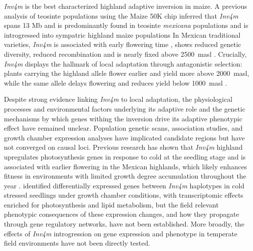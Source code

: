 \documentclass[9pt,twocolumn,twoside]{rilabRxiv}
\newcommand{\mex}{\textit{mexicana}\xspace}
\newcommand{\invfour}{\textit{Inv4m}\xspace}
\begin{document}
\invfour is the best characterized highland adaptive inversion in maize.
A previous analysis of teosinte populations using the Maize 50K chip inferred that \invfour spans 13 Mb and is predominantly found in teosinte \mex populations \cite{pyhajarvi2013} and is introgressed into sympatric highland maize populations \cite{pyhajarvi2013,calfee2021-mr,hufford2013-gs}
In Mexican traditional varieties, \invfour is associated with early flowering time \citep{romero_navarro2017-cn}, shows reduced genetic diversity, reduced recombination \citep{gonzalez-segovia2019-jy} and is nearly fixed above 2500~masl \citep{crow2020}.
Crucially, \invfour displays the hallmark of local adaptation through
antagonistic selection: plants carrying the highland allele flower
earlier and yield more above 2000~masl, while the same allele delays
flowering and reduces yield below 1000~masl \citep{crow2020}.

Despite strong evidence linking \invfour to local adaptation, the physiological processes and environmental factors underlying its adaptive role and the genetic mechanisms by which genes withing the inversion drive its adaptive phenotypic effect have remained unclear.
Population genetic scans, association studies, and growth chamber expression analyses have implicated candidate regions but have not converged on causal loci.
Previous research has shown that \invfour highland upregulates photosynthesis genes in response to cold at the seedling stage \cite{crow2020} and is associated with earlier flowering in the Mexican highlands, which likely enhances fitness in environments with limited growth degree accumulation throughout the year \cite{romero_navarro2017-cn, eagles1994, giauffret2000}.
\cite{crow2020} identified differentially expressed genes between
\invfour haplotypes in cold stressed seedlings under growth chamber
conditions, with transcriptomic effects enriched for photosynthesis and
lipid metabolism, but the field relevant phenotypic consequences of
these expression changes, and how they propagate through gene regulatory
networks, have not been established.
More broadly, the effects of \invfour introgression on gene expression and phenotype in temperate field environments have not been directly tested.
\end{document}
